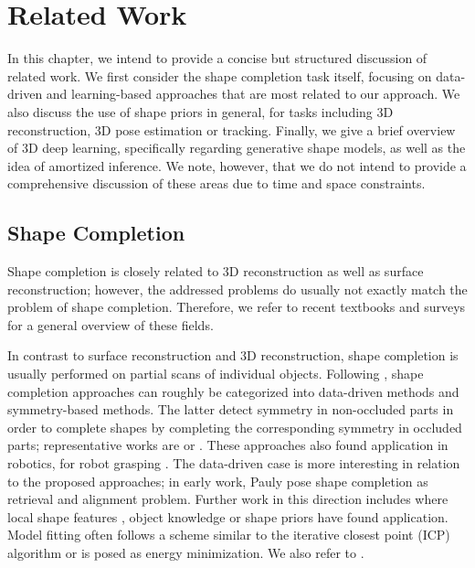 \chapter{Related Work}
\label{ch:related-work}

In this chapter, we intend to provide a concise but structured discussion
of related work. We first consider the shape completion task itself, focusing
on data-driven and learning-based approaches that are most related to our approach.
We also discuss the use of shape priors in general, \eg for tasks including
3D reconstruction, 3D pose estimation or tracking. Finally, we give a brief
overview of 3D deep learning, specifically regarding generative shape models,
as well as the idea of amortized inference. We note, however, that we do not intend
to provide a comprehensive discussion of these areas due to time and space constraints.

\section{Shape Completion}

Shape completion is closely related to 3D reconstruction as well as
surface reconstruction; however, the addressed problems
do usually not exactly match the problem of shape completion.
Therefore, we refer to recent textbooks
\cite{ForsythPonce:2012, Szeliski:2011} and surveys
\cite{MoonsVanGoolVergauwen:2010,FurukawaHernandez:2015,
BergerSilva:2014,BrecksonFisher:2005}
for a general overview of these fields.

In contrast to surface reconstruction and 3D reconstruction, shape completion
is usually performed on partial scans of individual objects.
Following \cite{SungAngstGuibas:2015}, shape completion approaches
can roughly be categorized into data-driven methods and symmetry-based
methods.
The latter detect symmetry in non-occluded parts in order to complete shapes
by completing the corresponding symmetry in occluded parts; representative works
are \cite{ThrunWegbreit:2005,PaulyGuibas:2008,ZhengChen:2010,KroemerPeters:2012}
or \cite{LawAliaga:2011}. These approaches also found application in robotics,
\eg for robot grasping \cite{KroemerPeters:2012,MartonRusuBeetz:2009}.
The data-driven case is more interesting
in relation to the proposed approaches; in early work, Pauly \etal
\cite{PaulyGuibas:2005} pose shape completion as retrieval and
alignment problem. Further work in this direction includes \eg
\cite{LiDaiGuibasNiessner:2015,NanSharf:2012,GuptaMalik:2015,DameReid:2013,
EngelmannStuecklerLeibe:2016,EngelmannLeibe:2017} where 
local shape features \cite{LiDaiGuibasNiessner:2015,NanSharf:2012},
object knowledge \cite{GuptaMalik:2015,DameReid:2013} or shape priors
\cite{EngelmannStuecklerLeibe:2016,EngelmannLeibe:2017,DameReid:2013} have found application.
Model fitting often follows a scheme similar to the
iterative closest point (ICP) algorithm \cite{BeslMcKay:1992} or is posed
as energy minimization. We also refer to \cite[Table~1]{BergerSilva:2014}.

